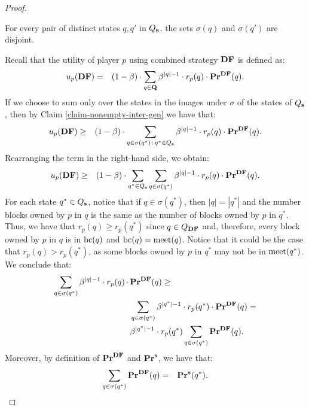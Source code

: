 \begin{proof}
\begin{myclaim}
\label{claim-nonempty-inter-gen}
For every pair of distinct states $q,q'$ in $Q_{\mathbf{s}}$, the sets $\sigma(q)$ and $\sigma(q')$ are disjoint. 
\end{myclaim}

Recall that the utility of player $p$ using combined strategy $\text{\rm {\bf DF}}$ 
is defined as:
\begin{eqnarray*}
u_p(\text{\rm {\bf DF}}) & = & (1-\beta) \cdot \sum_{q \in \mathbf{Q}} \beta^{|q|-1} \cdot  r_p(q) \cdot \mathbf{Pr}^{\text{\rm {\bf DF}}}(q).
\end{eqnarray*}
If we choose to sum only over the states in the images under $\sigma$ of the states of $Q_{\mathbf{s}}$, then by Claim \ref{claim-nonempty-inter-gen} we have that:
\begin{eqnarray*}
u_p(\text{\rm {\bf DF}}) & \geq & (1-\beta) \cdot  \sum_{q \in \sigma(q^*) \,:\, q^* \in Q_{\mathbf{s}}} \beta^{|q|-1} \cdot  r_p(q) \cdot \mathbf{Pr}^{\text{\rm {\bf DF}}}(q).
\end{eqnarray*}
Rearranging the term in the right-hand side, we obtain:
\begin{eqnarray*}
u_p(\text{\rm {\bf DF}}) & \geq &(1-\beta) \cdot \sum_{q^* \in Q_{\mathbf{s}}}   \sum_{q \in \sigma(q^*)} \beta^{|q|-1} \cdot  r_p(q) \cdot \mathbf{Pr}^{\text{\rm {\bf DF}}}(q).
\end{eqnarray*}
For each state $q^* \in Q_{\mathbf{s}}$, notice that if $q \in \sigma(q^*)$, then $|q| = |q^*|$ and the number blocks owned by $p$ in $q$ is the same as the number of blocks owned by $p$ in $q^*$. Thus, we have that $r_p(q) \geq r_p(q^*)$ since $q \in Q_{\text{\rm {\bf DF}}}$ and, therefore, every block owned by $p$ in $q$ is in $\text{bc}(q)$ and $\text{bc}(q) = \text{\rm meet}(q)$.
        Notice that it could be the case that $r_p(q) > r_p(q^*)$, as some blocks owned by $p$ in $q^*$  may not be in $\text{\rm meet}(q^*)$. We conclude that:
\begin{align*}
\sum_{q \in \sigma(q^*)} \beta^{|q|-1} \cdot  r_p(q) \, \cdot \, & \mathbf{Pr}^{\text{\rm {\bf DF}}}(q) \geq \\
&\sum_{q \in \sigma(q^*)} \beta^{|q^*|-1} \cdot  r_p(q^*) \cdot \mathbf{Pr}^{\text{\rm {\bf DF}}}(q) = \\
&\beta^{|q^*|-1} \cdot  r_p(q^*) \sum_{q \in \sigma(q^*)}  \mathbf{Pr}^{\text{\rm {\bf DF}}}(q).
\end{align*}
Moreover, by definition of $\mathbf{Pr}^{\text{\rm {\bf DF}}}$ and $\mathbf{Pr}^{\mathbf{s}}$, we have that:
\begin{eqnarray*}
\sum_{q \in \sigma(q^*)}  \pr^{\cdf}(q) & = & \pr^{\bs}(q^*).

\end{eqnarray*}
\end{proof}
